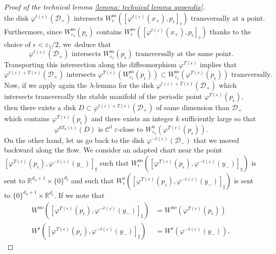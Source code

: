\documentclass[11pt]{article}
\newcommand{\rs}{\mathrm{s}}
\newcommand{\rso}{\mathrm{so}}
\newcommand{\ru}{\mathrm{u}}
\newcommand{\ruo}{\mathrm{uo}}
\theoremstyle{definition}
\theoremstyle{plain}
\newcommand{\Ccal}{\mathcal{C}}
\newcommand{\D}{\mathcal{D}}
\newcommand{\R}{\mathbb{R}}
\begin{document}
\begin{appendix}
\begin{proof}[Proof of the technical lemma \ref{lemma: technical lemma appendix}]
\[
\text{the disk $\varphi^{t (\varepsilon)} (\D_{+})$ intersects $W_{\epsilon}^{\rso} ([\varphi^{t (\varepsilon)} (x_+),p_{\epsilon}]_{\flat})$ transversally at a point.}
\]
Furthermore, since $W_{\varepsilon_1}^{\rso} (p_{\epsilon})$ contains $W_{\epsilon}^{\rso} ([\varphi^{t (\varepsilon)} (x_+),p_{\epsilon}]_{\flat})$ thanks to the choice of $\epsilon < \varepsilon_1 / 2$, we~deduce that
\[
\varphi^{t (\varepsilon)} (\D_{+}) \text{ intersects } W_{\varepsilon_1}^{\rso} (p_{\epsilon}) \text{ transversally at the same point}.
\]
Transporting this intersection along the diffeomorphism $\varphi^{T (\epsilon)}$ implies that
\[
\varphi^{t (\varepsilon)+ T (\epsilon)} (\D_{+}) \text{ intersects } \varphi^{T (\epsilon)} \left(W_{\varepsilon_1}^{\rso} (p_{\epsilon}) \right) \subset W_{\varepsilon_1}^{\rso} (\varphi^{T (\epsilon)} (p_{\epsilon})) \text{ transversally}.
\]
Now, if we apply again the $\lambda$-lemma for the disk $\varphi^{t (\varepsilon)+ T (\epsilon)} (\D_{+})$ which intersects transversally the stable manifold of the periodic point $\varphi^{T (\epsilon)} (p_{\epsilon})$, then there exists a disk $D \subset \varphi^{t (\varepsilon)+ T (\epsilon)} (\D_{+})$ of same dimension than $\D_+$ which contains $\varphi^{T (\epsilon)} (p_{\epsilon})$ and there exists an integer $k$ sufficiently large so that
\begin{equation}\label{eq: proof technical lemma - final transversality pushing forward}
\varphi^{k T_0 (\epsilon)} (D) \text{ is } \Ccal^1 \: \varepsilon \text{-close to } W_{\varepsilon_1}^{\ru} (\varphi^{T (\epsilon)} (p_{\epsilon})).
\end{equation}
On the other hand, let us go back to the disk $\varphi^{-t (\varepsilon)}(\D_{-})$ that we moved backward along the flow. We consider an adapted chart near the point $[\varphi^{T (\epsilon)} (p_{\epsilon}), \varphi^{- t (\varepsilon)} (y_-)]_{\sharp}$ such that $W_{\epsilon}^{\ruo}([\varphi^{T (\epsilon)} (p_{\epsilon}), \varphi^{- t (\varepsilon)} (y_-)]_{\sharp}) $ is sent to $\R^{d_\ru + 1} \times \{0\}^{d_\rs}$ and such that $W_{\epsilon}^{s} ([\varphi^{T (\epsilon)} (p_{\varepsilon}), \varphi^{- t (\varepsilon)} (y_-)]_{\sharp}) $ is sent to $\{0\}^{d_\ru + 1 } \times \R^{d_\rs}$. If we note that
\begin{align*}
W^{\ruo}([\varphi^{T (\epsilon)} (p_{\epsilon}), \varphi^{- t (\varepsilon)} (y_-)]_{\sharp}) &= W^{\ruo}(\varphi^{T (\epsilon)} (p_{\epsilon}))\\
\tag*{and}
W^{\rs} ([\varphi^{T (\epsilon)} (p_{\varepsilon}), \varphi^{- t (\varepsilon)} (y_-)]_{\sharp}) &= W^{\rs} (\varphi^{- t (\varepsilon)} (y_-)),

\end{align*}
\end{proof}
\end{appendix}
\end{document}
